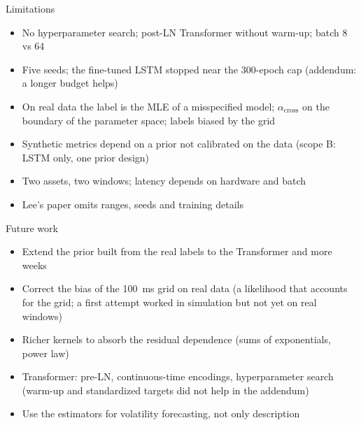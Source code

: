 \documentclass[aspectratio=169,11pt]{beamer}
\newcommand{\across}{\alpha_{\mathrm{cross}}}
\begin{document}
\begin{frame}{Limitations}
  \begin{itemize}
    \item No hyperparameter search; post-LN Transformer without warm-up; batch 8 vs 64
    \item Five seeds; the fine-tuned LSTM stopped near the 300-epoch cap (addendum: a longer
          budget helps)
    \item On real data the label is the MLE of a misspecified model;
          \(\across\) on the boundary of the parameter space; labels biased by the grid
    \item Synthetic metrics depend on a prior not calibrated on the data (scope B: LSTM only,
          one prior design)
    \item Two assets, two windows; latency depends on hardware and batch
    \item Lee's paper omits ranges, seeds and training details
  \end{itemize}
\end{frame}

\begin{frame}{Future work}
  \begin{itemize}
    \item Extend the prior built from the real labels to the Transformer and more weeks
    \item Correct the bias of the 100~ms grid on real data (a likelihood that accounts for
          the grid; a first attempt worked in simulation but not yet on real windows)
    \item Richer kernels to absorb the residual dependence (sums of exponentials,
          power law)
    \item Transformer: pre-LN, continuous-time encodings, hyperparameter search
          (warm-up and standardized targets did not help in the addendum)
    \item Use the estimators for volatility forecasting, not only description
  \end{itemize}
\end{frame}
\end{document}
